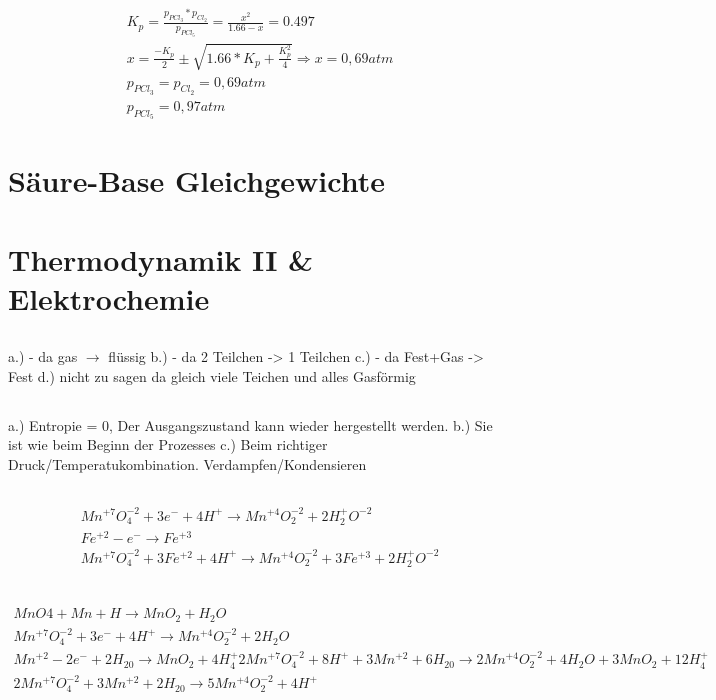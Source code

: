 \documentclass[a4paper]{article}
\begin{document}
\subsection{}
\begin{align}
  K_p = \frac{p_{PCl_3}*p_{Cl_2}}{p_{PCl_5}}=\frac{x^2}{1.66-x}=0.497\\
  x=\frac{-K_p}{2} \pm \sqrt{1.66*K_p+\frac{K_p^2}{4}} \Rightarrow x=0,69 atm\\
  p_{PCl_3} = p_{Cl_2}=0,69 atm\\
  p_{PCl_5} = 0,97 atm
\end{align}

\section{Säure-Base Gleichgewichte}

\section{Thermodynamik II \& Elektrochemie}
\subsection{}
a.) - da gas $\rightarrow$ flüssig
b.) - da 2 Teilchen -> 1 Teilchen
c.) - da Fest+Gas -> Fest
d.) nicht zu sagen da gleich viele Teichen und alles Gasförmig

\subsection{}
a.) Entropie = 0, Der Ausgangszustand kann wieder hergestellt werden.
b.) Sie ist wie beim Beginn der Prozesses
c.) Beim richtiger Druck/Temperatukombination. Verdampfen/Kondensieren  

\subsection{}
\begin{align}
  Mn^{+7}O_4^{-2} +3 e^- +4 H^+ \rightarrow Mn^{+4}O_2^{-2} +2 H_2^+O^{-2}\\
  Fe^{+2} - e^- \rightarrow Fe^{+3}\\
  Mn^{+7}O_4^{-2} +3 Fe^{+2} +4 H^+ \rightarrow Mn^{+4}O_2^{-2} + 3 Fe^{+3} +2 H_2^+O^{-2}\\
\end{align}

\subsection{}
\begin{align}
  MnO4 + Mn + H \rightarrow MnO_2 + H_2O\\
  Mn^{+7}O_4^{-2} + 3e^- +4H^+ \rightarrow Mn^{+4}O_2^{-2} + 2 H_2O\\
  Mn^{+2} -2e^- + 2H_20 \rightarrow MnO_2 + 4 H_4^+
  2Mn^{+7}O_4^{-2} +8H^+ +3 Mn^{+2} + 6H_20 \rightarrow 2Mn^{+4}O_2^{-2} + 4H_2O + 3MnO_2+12H_4^+\\
2Mn^{+7}O_4^{-2} +3 Mn^{+2} + 2H_20 \rightarrow 5Mn^{+4}O_2^{-2} +4 H^+
\end{align}
\end{document}
